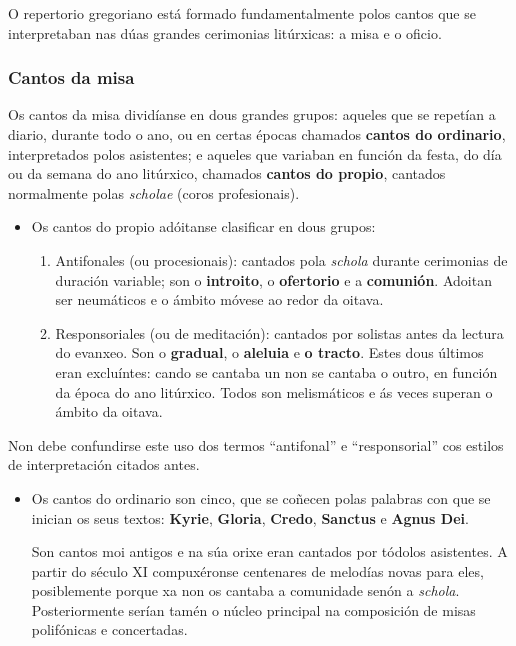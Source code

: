 \documentclass[spanish, a4paper,nobind]{templates/ociamthesis}
\providecommand{\tightlist}{%
  \setlength{\itemsep}{0pt}\setlength{\parskip}{0pt}}
\begin{document}
O repertorio gregoriano está formado fundamentalmente polos cantos que se interpretaban nas dúas grandes cerimonias litúrxicas: a misa e o oficio.

\hypertarget{cantos-da-misa}{%
\subsubsection*{Cantos da misa}\label{cantos-da-misa}}

Os cantos da misa dividíanse en dous grandes grupos: aqueles que se repetían a diario, durante todo o ano, ou en certas épocas chamados \textbf{cantos do ordinario}, interpretados polos asistentes; e aqueles que variaban en función da festa, do día ou da semana do ano litúrxico, chamados \textbf{cantos do propio}, cantados normalmente polas \emph{scholae} (coros profesionais).

\begin{itemize}
\item
  Os cantos do propio adóitanse clasificar en dous grupos:

  \begin{enumerate}
  \def\labelenumi{\arabic{enumi}.}
  \tightlist
  \item
    Antifonales (ou procesionais): cantados pola \emph{schola} durante cerimonias de duración variable; son o \textbf{introito}, o \textbf{ofertorio} e a \textbf{comunión}. Adoitan ser neumáticos e o ámbito móvese ao redor da oitava.
  \item
    Responsoriales (ou de meditación): cantados por solistas antes da lectura do evanxeo. Son o \textbf{gradual}, o \textbf{aleluia} e \textbf{o tracto}. Estes dous últimos eran excluíntes: cando se cantaba un non se cantaba o outro, en función da época do ano litúrxico. Todos son melismáticos e ás veces superan o ámbito da oitava.
  \end{enumerate}
\end{itemize}

Non debe confundirse este uso dos termos ``antifonal'' e ``responsorial'' cos estilos de interpretación citados antes.

\begin{itemize}
\item
  Os cantos do ordinario son cinco, que se coñecen polas palabras con que se inician os seus textos: \textbf{Kyrie}, \textbf{Gloria}, \textbf{Credo}, \textbf{Sanctus} e \textbf{Agnus Dei}.

  Son cantos moi antigos e na súa orixe eran cantados por tódolos asistentes. A partir do século XI compuxéronse centenares de melodías novas para eles, posiblemente porque xa non os cantaba a comunidade senón a \emph{schola}. Posteriormente serían tamén o núcleo principal na composición de misas polifónicas e concertadas.
\end{itemize}
\end{document}
